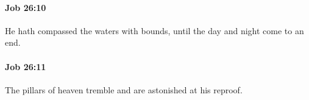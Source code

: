 		\paragraph{Job 26:10} %
			\label{JOB-26-10}

			He hath compassed the waters with bounds, until the day and night come to an end.


		\paragraph{Job 26:11} %
			\label{JOB-26-11}

			The pillars of heaven tremble and are astonished at his reproof.



